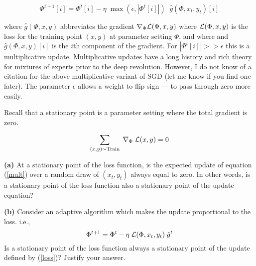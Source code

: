 \documentclass{article}
\newcommand{\solution}[1]{}
\begin{document}
\begin{equation}
  \Phi^{t+1}[i] = \Phi^t[i] - \eta \;\max(\epsilon,|\Phi^t[i]|)\;\;\hat{g}(\Phi,x_t,y_t)[i]
  \label{mult}
\end{equation}

where $\hat{g}(\Phi,x,y)$ abbreviates the gradient $\nabla_\Phi{\cal L}(\Phi,x,y)$ where ${\cal L}(\Phi,x,y)$ is the loss for the training point $(x,y)$ at parameter setting $\Phi$, and where
and $\hat{g}(\Phi,x,y)[i]$ is the $i$th component of the gradient.  For $|\Phi^t[i]| >> \epsilon$ this is a multiplicative update.
Multiplicative updates have a long history and rich theory for mixtures of experts prior to the deep revolution.  However, I do not know of a citation for
the above multiplicative variant of SGD (let me know if you find one later).  The parameter $\epsilon$ allows a weight to flip sign --- to pass through zero more easily.

Recall that a stationary point is a parameter setting where the total gradient is zero.

\begin{equation}
  \sum_{(x,y) \sim \mathrm{Train}}\; \nabla_\Phi\;{\cal L}(x,y) = 0
  \label{stationary}
\end{equation}

\medskip
    {\bf (a)} At a stationary point of the loss function, is the expected update of equation (\ref{mult}) over a random draw of $(x_t,y_t)$ always equal to zero.  In other words, is a stationary point of the loss function
    also a stationary point of the update equation?

\solution{Yes, a stationary point of the loss function is also a stationary point of the update equation.
  \begin{eqnarray*}
    & & E_{(x,y) \sim \train} \;\;\eta\;\min(\epsilon,|\Phi^t[i]|)\;\left(\nabla_\Phi \;{\cal L}(\Phi,x,y)\right)[i]  \\
    \\
    & = & \eta\;\min(\epsilon,|\Phi[i]|)\;E_{(x,y)\sim\train} \left(\nabla_\Phi {\cal L}(\Phi,x,y)\right)[i] \\
    \\
    & = & 0
  \end{eqnarray*}
  }

\medskip
{\bf (b)} Consider an adaptive algorithm which makes the update proportional to the loss. i.e.,
\begin{equation}
  \Phi^{t+1}= \Phi^t - \eta\;{\cal L}(\Phi,x_t,y_t)\;\hat{g}^t
  \label{loss}
\end{equation}
Is a stationary point of the loss function always a stationary point of the update defined by (\ref{loss})?  Justify your answer.
\end{document}
